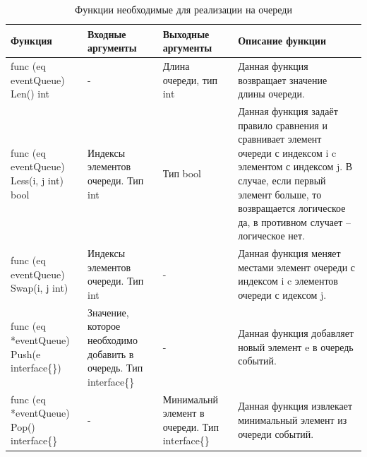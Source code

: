 \begin{table}[]
	\centering
	\caption{Функции необходимые для реализации на очереди}
	\label{tab:queue}
	\begin{tabularx}{\textwidth}{|X|X|X|X|}
		\hline
		Функция                                      & Входные аргументы                                                          & Выходные аргументы                              & Описание функции                                                                                                                                                                                                         \\ \hline
		func (eq eventQueue) Len() int               & -                                                                          & Длина очереди, тип int                          & Данная функция возвращает значение длины очереди.                                                                                                                                                                        \\ \hline
		func (eq eventQueue) Less(i, j int) bool     & Индексы элементов очереди. Тип int                                         & Тип bool                                        & Данная функция задаёт правило сравнения и  сравнивает элемент очереди с индексом i c элементом с индексом j. В случае, если первый элемент больше, то возвращается логическое да, в противном случает -- логическое нет. \\ \hline
		func (eq eventQueue) Swap(i, j int)          & Индексы элементов очереди. Тип int                                         & -                                               & Данная функция меняет местами элемент очереди с индексом i c элементов очереди с идексом j.                                                                                                                              \\ \hline
		func (eq *eventQueue) Push(e interface\{\})  & Значение, которое необходимо добавить в очередь. Тип interface\{\}         & -                                               & Данная функция добавляет новый элемент e в очередь событий.                                                                                                                                                              \\ \hline
		func (eq *eventQueue) Pop() interface\{\}    & -                                                                          & Минимальнй элемент в очереди. Тип interface\{\} & Данная функция извлекает минимальный элемент из очереди событий.                                                                                                                                                         \\ \hline

\end{tabularx}
\end{table}
